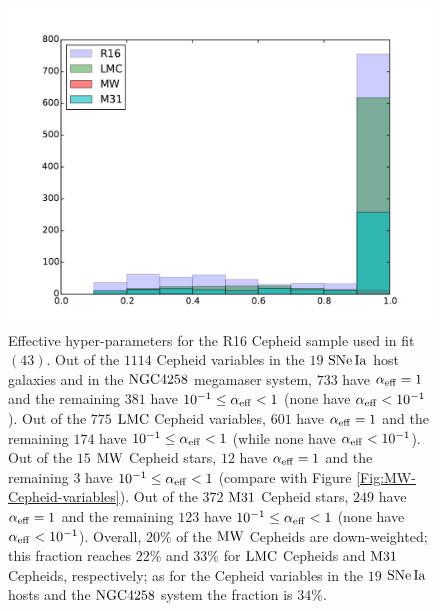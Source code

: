 \begin{figure}[hbtp]
\centering
\includegraphics[width=\textwidth]{figures/chapter-h0/effective_HP_histogram_R16.pdf}
\caption{Effective hyper-parameters for the R16 Cepheid sample used in fit $(43)$. Out of the $1114$ Cepheid variables in the $19$ $\mathrm{SNe\,Ia}$ host galaxies and in the $\mathrm{NGC4258}$ megamaser system, $733$ have $\alpha_{\mathrm{eff}}=1$ and the remaining  $381$ have $10^{-1}\leq \alpha_{\mathrm{eff}} < 1$ (none have $\alpha_{\mathrm{eff}} < 10^{-1}$). Out of the $775$ $\mathrm{LMC}$ Cepheid variables, $601$ have $\alpha_{\mathrm{eff}}=1$ and the remaining $174$ have $10^{-1}\leq \alpha_{\mathrm{eff}} < 1$ (while none have  $\alpha_{\mathrm{eff}} < 10^{-1}$). Out of the $15$ $\mathrm{MW}$ Cepheid stars, $12$ have $\alpha_{\mathrm{eff}}=1$ and the remaining $3$ have  $10^{-1}\leq \alpha_{\mathrm{eff}} < 1$ (compare with Figure \ref{Fig:MW-Cepheid-variables}). Out of the $372$ $\mathrm{M31}$ Cepheid stars, $249$ have $\alpha_{\mathrm{eff}}=1$ and the remaining $123$ have $10^{-1}\leq \alpha_{\mathrm{eff}} < 1$ (none have  $\alpha_{\mathrm{eff}} < 10^{-1}$). Overall, $20\%$ of the $\mathrm{MW}$ Cepheids are down-weighted; this fraction reaches $22\%$ and $33\%$  for $\mathrm{LMC}$ Cepheids and $\mathrm{M31}$ Cepheids, respectively; as for the Cepheid variables in the $19$ $\mathrm{SNe\,Ia}$ hosts and the $\mathrm{NGC4258}$ system the fraction is $34\%$.}
\label{Fig:effective-HP-fit-43}
\end{figure}

